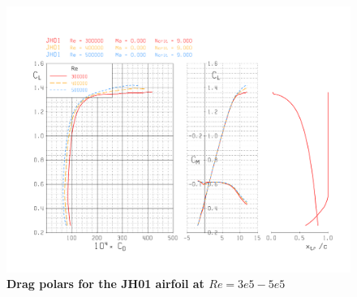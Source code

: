 \documentclass[journal]{aiaa-tc}%
\begin{document}
    \begin{figure}[h!]
    \begin{center}
    \includegraphics[width = .75\textwidth]{4_JH01_Polars}
     \caption{ \textbf{Drag polars for the JH01 airfoil at $Re = 3e5-5e5$} }
    \label{f:4_JH01_Polars2}
    \end{center}
    \end{figure}
    
\end{document}
